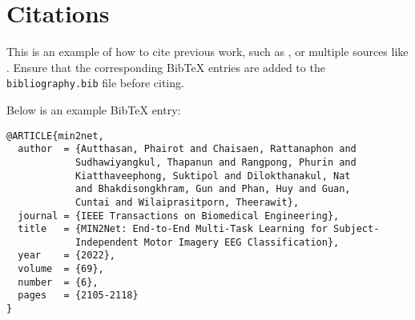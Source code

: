 \section{Citations}
\begin{paragraph}
This is an example of how to cite previous work, such as \cite{min2net}, or multiple sources like \cite{hu79, somework2020, tonio_paper}. Ensure that the corresponding BibTeX entries are added to the \texttt{bibliography.bib} file before citing.

Below is an example BibTeX entry:

\begin{verbatim}
@ARTICLE{min2net,
  author  = {Autthasan, Phairot and Chaisaen, Rattanaphon and 
            Sudhawiyangkul, Thapanun and Rangpong, Phurin and 
            Kiatthaveephong, Suktipol and Dilokthanakul, Nat 
            and Bhakdisongkhram, Gun and Phan, Huy and Guan, 
            Cuntai and Wilaiprasitporn, Theerawit},
  journal = {IEEE Transactions on Biomedical Engineering}, 
  title   = {MIN2Net: End-to-End Multi-Task Learning for Subject-
            Independent Motor Imagery EEG Classification}, 
  year    = {2022},
  volume  = {69},
  number  = {6},
  pages   = {2105-2118}
}
\end{verbatim}

\end{paragraph}

